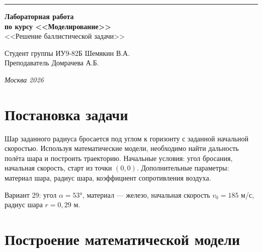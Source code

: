 \documentclass[a4paper, 14pt]{extarticle}
\begin{document}
\begin{titlepage}
\vspace*{-16pt}
\hspace{30pt}\rule{0.866\textwidth}{0.4pt}
  
\vspace{11em}

\begin{center}
\Large {\bf Лабораторная работа} \\ 
\large {\bf по курсу <<Моделирование>>} \\
\large <<Решение баллистической задачи>> 
\end{center}\normalsize

\vspace{8em}


\begin{flushright}
  {Студент группы ИУ9-82Б Шемякин В.А. \hspace*{15pt}\\ 
  \vspace{2ex}
  Преподаватель Домрачева А.Б.\hspace*{15pt}}
\end{flushright}

\bigskip

\vfill
 

\begin{center}
\textsl{Москва 2026}
\end{center}
\end{titlepage}

\renewcommand{\ttdefault}{pcr}

\setlength{\tabcolsep}{3pt}
\newpage
\setcounter{page}{2}
\section{Постановка задачи}
Шар заданного радиуса бросается под углом к горизонту с заданной начальной скоростью. Используя математические модели, необходимо найти дальность полёта шара и построить траекторию. Начальные условия: угол бросания, начальная скорость, старт из точки $(0,0)$. Дополнительные параметры: материал шара, радиус шара, коэффициент сопротивления воздуха.

Вариант 29: угол $\alpha = 53°$, материал --- железо, начальная скорость $v_0 = 185$ м/с, радиус шара $r = 0{,}29$ м. 

\section{Построение математической модели}
\end{document}
